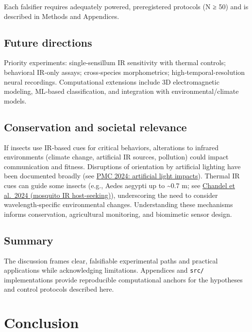 \documentclass[
  13pt,
  a4paperpaper,
  12pt]{article}
\newcommand{\passthrough}[1]{#1}
\let\oldsection\section
\renewcommand{\section}{\clearpage\oldsection}
\begin{document}
Each falsifier requires adequately powered, preregistered protocols (N ≥
50) and is described in Methods and Appendices.

\subsection{Future directions}\label{future-directions}

Priority experiments: single‑sensillum IR sensitivity with thermal
controls; behavioral IR‑only assays; cross‑species morphometrics;
high‑temporal-resolution neural recordings. Computational extensions
include 3D electromagnetic modeling, ML‑based classification, and
integration with environmental/climate models.

\subsection{Conservation and societal
relevance}\label{conservation-and-societal-relevance}

If insects use IR‑based cues for critical behaviors, alterations to
infrared environments (climate change, artificial IR sources, pollution)
could impact communication and fitness. Disruptions of orientation by
artificial lighting have been documented broadly (see
\href{https://pmc.ncbi.nlm.nih.gov/articles/PMC10827719/}{PMC 2024:
artificial light impacts}). Thermal IR cues can guide some insects
(e.g., Aedes aegypti up to \textasciitilde0.7 m; see
\href{https://www.nature.com/articles/s41586-024-07848-5}{Chandel et
al.~2024 (mosquito IR host-seeking)}), underscoring the need to consider
wavelength‑specific environmental changes. Understanding these
mechanisms informs conservation, agricultural monitoring, and biomimetic
sensor design.

\subsection{Summary}\label{summary}

The discussion frames clear, falsifiable experimental paths and
practical applications while acknowledging limitations. Appendices and
\passthrough{\lstinline!src/!} implementations provide reproducible
computational anchors for the hypotheses and control protocols described
here.

\section{Conclusion}\label{sec:conclusion}
\end{document}
